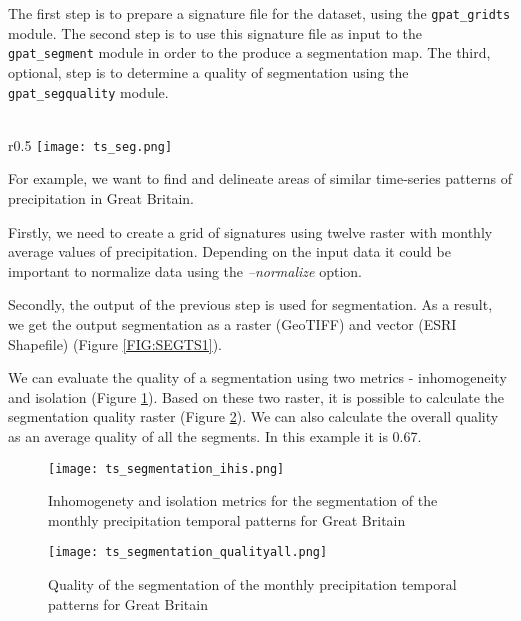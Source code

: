 The first step is to prepare a signature file for the dataset, using the {\tt gpat\_gridts} module.
The second step is to use this signature file as input to the {\tt gpat\_segment} module in order to the produce a segmentation map. 
The third, optional, step is to determine a quality of segmentation using the {\tt gpat\_segquality} module.\\\\

\newpage

\begin{wrapfigure}{r}{0.5\textwidth}
	\centering
	\texttt{[image: ts\_seg.png]}
	\caption{Segments of the monthly precipitation temporal patterns for Great Britain}
	\label{FIG:SEGTS1}
\end{wrapfigure}

For example, we want to find and delineate areas of similar time-series patterns of precipitation in Great Britain. 

Firstly, we need to create a grid of signatures using twelve raster with monthly average values of precipitation.
Depending on the input data it could be important to normalize data using the {\it --normalize} option.

Secondly, the output of the previous step is used for segmentation.
As a result, we get the output segmentation as a raster (GeoTIFF) and vector (ESRI Shapefile) (Figure \ref{FIG:SEGTS1}).

We can evaluate the quality of a segmentation using two metrics - inhomogeneity and isolation (Figure \ref{FIG:SEGTS2}).
Based on these two raster, it is possible to calculate the segmentation quality raster (Figure \ref{FIG:SEGTS3}).
We can also calculate the overall quality as an average quality of all the segments.
In this example it is 0.67.

\begin{figure}[H]
	\centering
	\texttt{[image: ts\_segmentation\_ihis.png]}
	\caption{Inhomogenety and isolation metrics for the segmentation of the monthly precipitation temporal patterns for Great Britain}
	\label{FIG:SEGTS2}
\end{figure}

\begin{figure}[H]
	\centering
	\texttt{[image: ts\_segmentation\_qualityall.png]}
	\caption{Quality of the segmentation of the monthly precipitation temporal patterns for Great Britain}
	\label{FIG:SEGTS3}
\end{figure}

